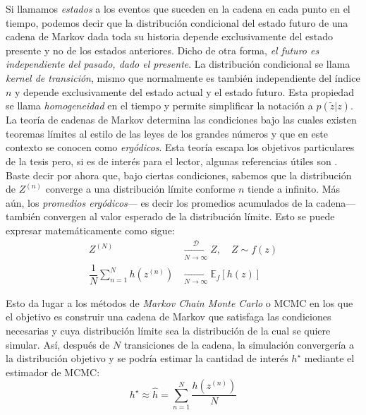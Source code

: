 Si llamamos \textit{estados} a los eventos que suceden en la cadena en cada punto en el tiempo, podemos decir que la distribución condicional del estado futuro de una cadena de Markov dada toda su historia depende exclusivamente del estado presente y no de los estados anteriores. Dicho de otra forma, \textit{el futuro es independiente del pasado, dado el presente}. La distribución condicional se llama \textit{kernel de transición}, mismo que normalmente es también independiente del índice $n$ y depende exclusivamente del estado actual y el estado futuro. Esta propiedad se llama \textit{homogeneidad} en el tiempo y permite simplificar la notación a $p(\tilde{z}|z)$.\\ 

La teoría de cadenas de Markov determina las condiciones bajo las cuales existen teoremas límites al estilo de las leyes de los grandes números y que en este contexto se conocen como \textit{ergódicos}. Esta teoría escapa los objetivos particulares de la tesis pero, si es de interés para el lector, algunas referencias útiles son \textcites{Rincon12,Neal93,Ross96,TaylorKarlin84}. Baste decir por ahora que, bajo ciertas condiciones, sabemos que la distribución de $Z^{(n)}$ converge a una distribución límite conforme $n$ tiende a infinito. Más aún, los \textit{promedios ergódicos}--- es decir los promedios acumulados de la cadena--- también convergen al valor esperado de la distribución límite. Esto se puede expresar matemáticamente como sigue:
\begin{subequations}\label{eq:Teo_Erg}
\begin{align}
Z^{(N)} &\xrightarrow[N\rightarrow\infty]{\mathcal{D}} Z, \quad Z \sim f(z) \label{eq:Teo_Erg_Conv_D} \\
\dfrac{1}{N}\sum\limits_{n=1}^N h\left(z^{(n)}\right) &\xrightarrow[N\rightarrow\infty]{} \mathbb{E}_{f}[h(z)]
\label{eq:Teo_Erg_Conv_Prom}
\end{align}
\end{subequations}

Esto da lugar a los métodos de \textit{Markov Chain Monte Carlo} o MCMC en los que el objetivo es construir una cadena de Markov que satisfaga las condiciones necesarias y cuya distribución límite sea la distribución de la cual se quiere simular. Así, después de $N$ transiciones de la cadena, la simulación convergería a la distribución objetivo y se podría estimar la cantidad de interés $h^\star$ mediante el estimador de MCMC: 
\begin{equation*}
h^\star \approx \hat{h} = \sum\limits_{n=1}^N \dfrac{h\left(z^{(n)}\right)}{N}
\end{equation*}

